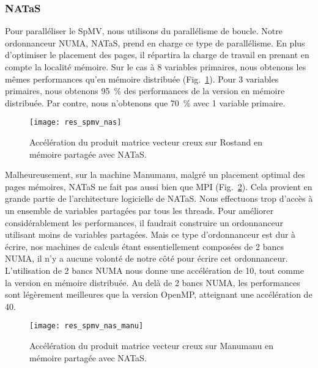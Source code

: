 \subsubsection{NATaS}
Pour paralléliser le SpMV, nous utilisons du parallélisme de boucle.
%
Notre ordonnanceur NUMA, NATaS, prend en charge ce type de parallélisme.
%
En plus d'optimiser le placement des pages, il répartira la charge de travail en prenant en compte la localité mémoire.
%
Sur le cas à 8 variables primaires, nous obtenons les mêmes performances qu'en mémoire distribuée (Fig.~\ref{fig:res_spmv_nas}).
%
Pour 3 variables primaires, nous obtenons 95~\% des performances de la version en mémoire distribuée.
%
Par contre, nous n'obtenons que 70~\% avec 1 variable primaire.

\begin{figure}[t!]
  \centering
  \texttt{[image: res\_spmv\_nas]}
  \caption{Accélération du produit matrice vecteur creux sur Rostand en mémoire partagée avec NATaS.}
  \label{fig:res_spmv_nas}
\end{figure}


Malheureusement, sur la machine Manumanu, malgré un placement optimal des pages mémoires, NATaS ne fait pas aussi bien que MPI (Fig.~\ref{fig:res_spmv_nas_manumanu}).
%
Cela provient en grande partie de l'architecture logicielle de NATaS.
%
Nous effectuons trop d'accès à un ensemble de variables partagées par tous les threads.
%
Pour améliorer considérablement les performances, il faudrait construire un ordonnanceur utilisant moins de variables partagées.
%
Mais ce type d'ordonnanceur est dur à écrire, nos machines de calculs étant essentiellement composées de 2 bancs NUMA, il n'y a aucune volonté de notre côté pour écrire cet ordonnanceur.
%
L'utilisation de 2 bancs NUMA nous donne une accélération de 10, tout comme la version en mémoire distribuée.
%
Au delà de 2 bancs NUMA, les performances sont légèrement meilleures que la version OpenMP, atteignant une accélération de 40.

\begin{figure}[t!]
  \centering
  \texttt{[image: res\_spmv\_nas\_manu]}
  \caption{Accélération du produit matrice vecteur creux sur Manumanu en mémoire partagée avec NATaS.}
  \label{fig:res_spmv_nas_manumanu}
\end{figure}
